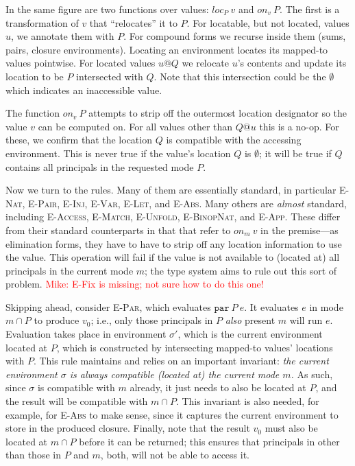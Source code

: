\documentclass[10pt]{article}
\makeatletter
\newcommand{\rulelab}[1]{{\small \textsc{#1}}}
\newcommand{\kw}[1]{\ensuremath{\mathtt{#1}}}
\newcommand{\epar}[2]{\ensuremath{\kw{par}~{#1}~{#2}}}
\newcommand{\vloc}[2]{\ensuremath{{#1}\kw{@}{#2}}}
\newcommand{\locof}[2]{\ensuremath{\mathit{loc}_{#1}~{#2}}}
\newcommand{\getat}[2]{\ensuremath{\mathit{on}_{#1}~{#2}}}
\newcommand{\mwh}[1]{\textcolor{red}{Mike: #1}}
\makeatother
\begin{document}
In the same figure are two functions over values: $\locof{P}{v}$ and
$\getat{v}{P}$. The first is a transformation of $v$ that
``relocates'' it to $P$. For locatable, but not located, values $u$,
we annotate them with $P$. For compound forms we recurse inside them
(sums, pairs, closure environments). Locating an environment locates
its mapped-to values pointwise.  For located values $\vloc{u}{Q}$ we
relocate $u$'s contents and update its location to be $P$ intersected
with $Q$. Note that this intersection could be the $\emptyset$ which
indicates an inaccessible value.

The function $\getat{v}{P}$ attempts to strip off the outermost
location designator so the value $v$ can be computed on. For all
values other than $\vloc{Q}{u}$ this is a no-op. For these, we confirm
that the location $Q$ is compatible with the accessing
environment. This is never true if the value's location $Q$ is
$\emptyset$; it will be true if $Q$ contains all principals in the
requested mode $P$.

Now we turn to the rules. Many of them are essentially standard, in
particular \rulelab{E-Nat}, \rulelab{E-Pair}, \rulelab{E-Inj},
\rulelab{E-Var}, \rulelab{E-Let}, and \rulelab{E-Abs}. Many others are
\emph{almost} standard, including \rulelab{E-Access},
\rulelab{E-Match}, \rulelab{E-Unfold}, \rulelab{E-BinopNat}, and
\rulelab{E-App}. These differ from their standard counterparts in that
that refer to $\getat{m}{v}$ in the premise---as elimination forms,
they have to have to strip off any location information to use the
value. This operation will fail if the value is not available to
(located at) all principals in the current mode $m$; the type system
aims to rule out this sort of problem.
\mwh{E-Fix is missing; not sure how to do this one!}

Skipping ahead, consider \rulelab{E-Par}, which evaluates
$\epar{P}{e}$. It evaluates $e$ in mode $m \cap P$ to produce $v_0$;
i.e., only those principals in $P$ \emph{also} present $m$ will run
$e$. Evaluation takes place in environment $\sigma'$, which is the
current environment located at $P$, which is constructed by
intersecting mapped-to values' locations with $P$. This rule maintains
and relies on an important invariant: \emph{the current environment
  $\sigma$ is always compatible (located at) the current mode $m$.} As
such, since $\sigma$ is compatible with $m$ already, it just needs to
also be located at $P$, and the result will be compatible with
$m \cap P$. This invariant is also needed, for example, for
\rulelab{E-Abs} to make sense, since it captures the current
environment to store in the produced closure. Finally, note that the
result $v_0$ must also be located at $m \cap P$ before it can be
returned; this ensures that principals in other than those in $P$ and
$m$, both, will not be able to access it.
\end{document}
